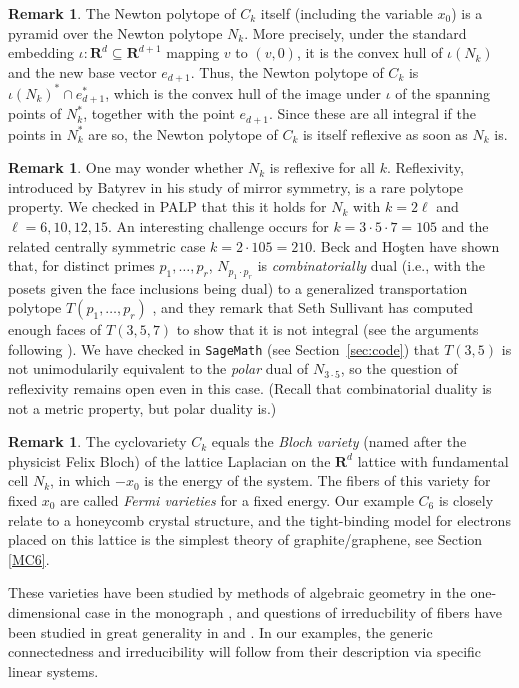 \documentclass[12pt,reqno]{amsart}
\theoremstyle{definition}
\theoremstyle{plain}
\theoremstyle{definition}
\newtheorem{remark}[theorem]{Remark}
\newcommand{\R}{\mathbf{R}}
\begin{document}
\begin{remark}  
The Newton polytope of $C_k$ itself (including the variable $x_0$)  is a pyramid over the Newton polytope $N_k$. More precisely, under the standard embedding  $\iota \colon \R^{d} \subseteq \R^{d+1}$ mapping $v$ to $(v,0)$, it is the convex hull of $\iota(N_k)$ and the new base vector $e_{d+1}$. Thus, the Newton polytope of $C_k$ is $\iota(N_k)^* \cap e_{d+1}^*$, which is the convex hull of the image under $\iota$ of the spanning points of $N_k^*$, together with the point $e_{d+1}$. Since these are all integral if the points in $N_k^*$ are so, the Newton polytope of $C_k$ is itself reflexive as soon as $N_k$ is. 
\end{remark}  

\begin{remark} \label{guessreflexive} 
One may wonder whether $N_k$ is reflexive for all $k$. Reflexivity, introduced by Batyrev in his study of mirror symmetry, is a rare polytope property. We checked in PALP that this it holds for $N_k$ with $k=2\ell$ and $\ell=6,10,12,15$. An interesting challenge occurs for $k=3\cdot 5 \cdot 7 = 105$ and the related centrally symmetric case $k=2 \cdot 105 = 210$. Beck and Ho\c{s}ten have shown that, for distinct primes $p_1,\dots,p_r$, $N_{p_1\cdot p_r}$ is \emph{combinatorially} dual (i.e., with the posets given the face inclusions being dual) to a generalized transportation polytope $T(p_1,\dots,p_r)$ \cite[Theorem 18]{BeckHosten}, and they remark that Seth Sullivant has computed enough faces of $T(3,5,7)$ to show that it is not integral (see the arguments following \cite[Conjecture 4]{BeckHosten}). We have checked in \texttt{SageMath} (see Section~\ref{sec:code}) that $T(3,5)$ is not unimodularily equivalent to the \emph{polar}  dual of $N_{3\cdot 5}$, so the question of reflexivity remains open even in this case. (Recall that combinatorial duality is not a metric property, but polar duality is.) 
\end{remark} 

\begin{remark} The cyclovariety $C_k$ equals the \emph{Bloch variety} (named after the physicist Felix Bloch) of the lattice Laplacian on the $\R^d$ lattice with fundamental cell $N_k$, in which $-x_0$ is the energy of the system. The fibers of this variety for fixed $x_0$ are called \emph{Fermi varieties} for a fixed energy. Our example $C_6$ is closely relate to a honeycomb crystal structure, and the tight-binding model for electrons placed on this lattice is the simplest theory of graphite/graphene, see Section \ref{MC6}. 

These varieties have been studied by methods of algebraic geometry in the one-dimensional case in the monograph  \cite{Fermibook}, and questions of irreducbility of fibers have been studied in great generality  in \cite{FillmanBloch} and \cite{FillmanFermi}. In our examples, the generic connectedness and irreducibility will follow from their description via specific linear systems. 
\end{remark}
\end{document}
